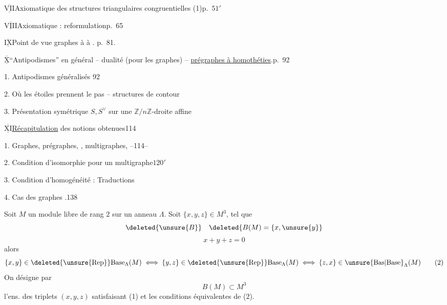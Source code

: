 $\overline{\underline{\mathrm{VII}}}$\quad Axiomatique des structures triangulaires congruentielles (1)\hfill p.~$51'$

$\overline{\underline{\mathrm{VIII}}}$\quad Axiomatique : reformulation\hfill p.~65

$\overline{\underline{\mathrm{IX}}}$\quad Point de vue graphes à   à  . \hfill p.~81.

$\overline{\underline{\mathrm{X}}}$\quad ``Antipodismes'' en général -- dualité (pour les  graphes) -- \uline{prégraphes à homothéties}.\hfill p.~92

1. Antipodismes généralisés\hfill {}  92

2. Où les étoiles prennent le pas -- structures de contour  

3. Présentation symétrique $S,S^\vee$ sur une $\mathbb{Z}/n\mathbb{Z}$-droite affine


$\overline{\underline{\mathrm{XI}}}$\quad \uline{Récapitulation} des notions obtenues\hfill 114

1. Graphes, prégraphes, , multigraphes,  --\hfill 114\qquad --

2. Condition d'isomorphie pour un multigraphe\hfill $120'$

3. Condition d'homogénéité : Traductions \hfill {}

4. Cas des graphes .\hfill 138


Soit $M$ un module libre de rang $2$ sur un anneau $\Lambda$.  Soit $\{x,y,z\}\in M^3$, tel que
\[
\deleted{\unsure{B}}\quad\deleted{B(M)=\{x,\unsure{y}}
\]
\[
x+y+z=0\tag*{(1)}
\]
alors
\[
\{x,y\}\in\deleted{\unsure{\mathrm{Rep}}}\mathrm{Base}_{\Lambda}(M)\iff\{y,z\}\in\deleted{\unsure{\mathrm{Rep}}}\mathrm{Base}_{\Lambda}(M)\iff\{z,x\}\in\unsure{\mathrm{Bas}|\mathrm{Base}}_{\Lambda}(M)\tag*{(2)}
\]
On désigne par
\[
B(M)\subset M^3\tag*{(3)}
\]
l'ens. des triplets $(x,y,z)$ satisfaisant (1)   et les conditions équivalentes de (2).

